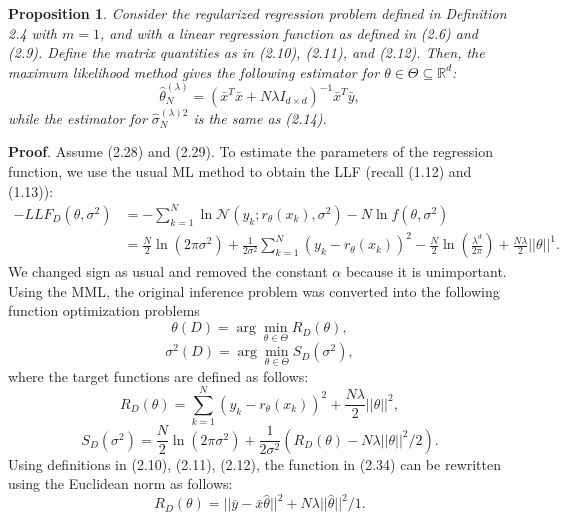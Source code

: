 \documentclass{report}
\newtheorem{proposition}{Proposition}[chapter]
\begin{document}
\begin{proposition}
Consider the regularized regression problem defined in Definition 2.4 with $m=1$, and with a linear regression function as defined in (2.6) and (2.9). Define the matrix quantities as in (2.10), (2.11), and (2.12). Then, the maximum likelihood method gives the following estimator for $\theta \in \Theta \subseteq \mathbb{R}^d$:
\begin{equation}
\hat{\theta}_N^{(\lambda)} = (\bar{x}^T\bar{x} +N\lambda I_{d\times d})^{-1}\bar{x}^T\bar{y},
\end{equation}
while the estimator for $\hat{\sigma}_N^{(\lambda)2}$ is the same as (2.14).
\end{proposition}
\textbf{Proof}. Assume (2.28) and (2.29). To estimate the parameters of the regression function, we use the usual ML method to obtain the LLF (recall (1.12) and (1.13)):
\begin{equation}
\begin{split}
-LLF_{D}(\theta,\sigma^2)&=-\sum_{k=1}^N\ln\mathcal{N}(y_k;r_\theta(x_k),\sigma^2) - N\ln f(\theta,\sigma^2)\\
&=\frac{N}{2}\ln(2\pi\sigma^2)+\frac{1}{2\sigma^2}\sum_{k=1}^N(y_k-r_\theta(x_k))^2 -\frac{N}{2}\ln (\frac{\lambda^d}{2\pi})+\frac{N\lambda}{2}||\theta||^1.
\end{split}
\end{equation}
We changed sign as usual and removed the constant $\alpha$ because it is unimportant. Using the MML, the original inference problem was converted into the following function optimization problems
\begin{equation}
 \theta(D) = \arg\min_{\theta \in \Theta} R_{D}(\theta),
\end{equation}
\begin{equation}
 \sigma^2(D) = \arg\min_{\theta \in \Theta} S_{D}(\sigma^2),
\end{equation}
where the target functions are defined as follows:
\begin{equation}
R_{D}(\theta) =\sum_{k=1}^N(y_k-r_\theta(x_k))^2 + \frac{N\lambda}{2}||\theta||^2,
\end{equation}
\begin{equation}
S_{D}(\sigma^2) = \frac{N}{2}\ln(2\pi\sigma^2)+\frac{1}{2\sigma^2}(R_{D}(\theta)-N\lambda||\theta||^2/2).
\end{equation}
Using definitions in (2.10), (2.11), (2.12), the function in (2.34) can be rewritten using the Euclidean norm as follows:
\begin{equation}
R_{D}(\theta) = ||\bar{y} -\bar{x}\hat{\theta}||^2 + N\lambda||\hat{\theta}||^2 / 1.
\end{equation}
\end{document}
